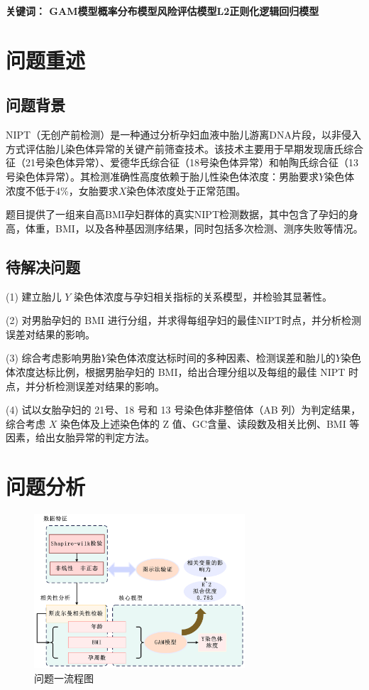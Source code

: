 \documentclass[12pt]{ctexart}
\begin{document}
	\textbf{关键词： GAM模型\quad 概率分布模型\quad   风险评估模型\quad   L2正则化逻辑回归模型}   
	
	\newpage
	
	\section{问题重述}
	\subsection{问题背景}
NIPT（无创产前检测）是一种通过分析孕妇血液中胎儿游离DNA片段，以非侵入方式评估胎儿染色体异常的关键产前筛查技术。该技术主要用于早期发现唐氏综合征（21号染色体异常）、爱德华氏综合征（18号染色体异常）和帕陶氏综合征（13号染色体异常）。其检测准确性高度依赖于胎儿性染色体浓度：男胎要求$Y$染色体浓度不低于4\%，女胎要求$X$染色体浓度处于正常范围。

题目提供了一组来自高BMI孕妇群体的真实NIPT检测数据，其中包含了孕妇的身高，体重，BMI，以及各种基因测序结果，同时包括多次检测、测序失败等情况。
	\subsection{待解决问题}
    (1) 建立胎儿 $Y$ 染色体浓度与孕妇相关指标的关系模型，并检验其显著性。
	
	(2) 对男胎孕妇的 BMI 进行分组，并求得每组孕妇的最佳NIPT时点，并分析检测误差对结果的影响。
	
	(3) 综合考虑影响男胎$ Y $染色体浓度达标时间的多种因素、检测误差和胎儿的$ Y $染色体浓度达标比例，根据男胎孕妇的 BMI，给出合理分组以及每组的最佳 NIPT 时点，并分析检测误差对结果的影响。
	
	(4) 试以女胎孕妇的 21号、18 号和 13 号染色体非整倍体（AB 列）为判定结果，综合考虑 $X$ 染色体及上述染色体的 Z 值、GC含量、读段数及相关比例、BMI 等因素，给出女胎异常的判定方法。
	
	\section{问题分析}
	
		
	\begin{figure}[H]
		\centering
		\includegraphics[width=0.7\textwidth]{Q1lc.png} %
		\caption{问题一流程图}
	\end{figure}
	
\end{document}
